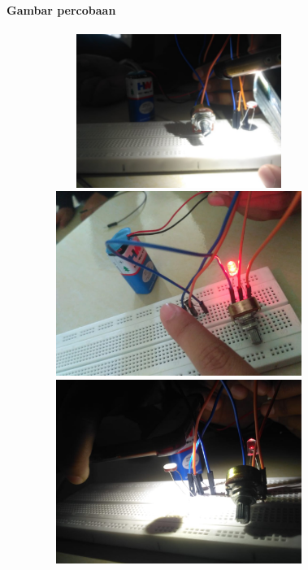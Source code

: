 \documentclass[12pt,a4paper]{article}
\begin{document}
\newpage
\begin{figure}
\paragraph{Gambar percobaan}
\paragraph{ }
\begin{center}

\includegraphics[width=12cm, height=5cm]{per4aa.png}

\includegraphics[width=12cm, height=6cm]{per4b.png}

\includegraphics[width=12cm, height=6cm]{per4bb.png}
\end{center}
\end{figure}
\vspace{2cm}
\end{document}
